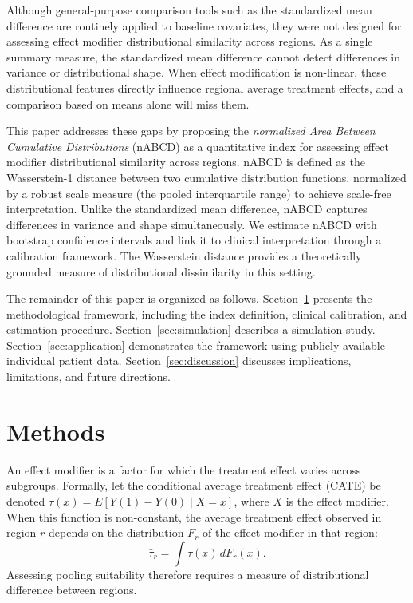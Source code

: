\documentclass[AMA,Times1COL]{WileyNJDv5}
\begin{document}
Although general-purpose comparison tools such as the standardized mean difference are routinely applied to baseline covariates,\cite{austin2011} they were not designed for assessing effect modifier distributional similarity across regions. As a single summary measure, the standardized mean difference cannot detect differences in variance or distributional shape. When effect modification is non-linear, these distributional features directly influence regional average treatment effects, and a comparison based on means alone will miss them.

This paper addresses these gaps by proposing the \emph{normalized Area Between Cumulative Distributions} (nABCD) as a quantitative index for assessing effect modifier distributional similarity across regions. nABCD is defined as the Wasserstein-1 distance between two cumulative distribution functions, normalized by a robust scale measure (the pooled interquartile range) to achieve scale-free interpretation. Unlike the standardized mean difference, nABCD captures differences in variance and shape simultaneously. We estimate nABCD with bootstrap confidence intervals and link it to clinical interpretation through a calibration framework. The Wasserstein distance provides a theoretically grounded measure of distributional dissimilarity in this setting.

The remainder of this paper is organized as follows. Section~\ref{sec:methods} presents the methodological framework, including the index definition, clinical calibration, and estimation procedure. Section~\ref{sec:simulation} describes a simulation study. Section~\ref{sec:application} demonstrates the framework using publicly available individual patient data. Section~\ref{sec:discussion} discusses implications, limitations, and future directions.

\section{Methods}\label{sec:methods}

An effect modifier is a factor for which the treatment effect varies across subgroups. Formally, let the conditional average treatment effect (CATE) be denoted $\tau(x) = E[Y(1) - Y(0) \mid X = x]$, where $X$ is the effect modifier. When this function is non-constant, the average treatment effect observed in region $r$ depends on the distribution $F_r$ of the effect modifier in that region:
\begin{equation}
\bar{\tau}_r = \int \tau(x) \, dF_r(x).
\label{eq:regional_ate}
\end{equation}
Assessing pooling suitability therefore requires a measure of distributional difference between regions.
\end{document}
